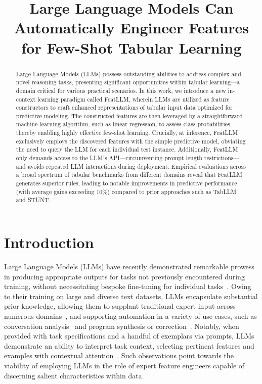 \title{Large Language Models Can Automatically Engineer Features for Few-Shot Tabular Learning}

\begin{abstract}
Large Language Models (LLMs) possess outstanding abilities to address complex and novel reasoning tasks, presenting significant opportunities within tabular learning—a domain critical for various practical scenarios. In this work, we introduce a new in-context learning paradigm called \textsf{FeatLLM}, wherein LLMs are utilized as feature constructors to craft enhanced representations of tabular input data optimized for predictive modeling. The constructed features are then leveraged by a straightforward machine learning algorithm, such as linear regression, to assess class probabilities, thereby enabling highly effective few-shot learning. Crucially, at inference, \textsf{FeatLLM} exclusively employs the discovered features with the simple predictive model, obviating the need to query the LLM for each individual test instance. Additionally, \textsf{FeatLLM} only demands access to the LLM's API—circumventing prompt length restrictions—and avoids repeated LLM interactions during deployment. Empirical evaluations across a broad spectrum of tabular benchmarks from different domains reveal that \textsf{FeatLLM} generates superior rules, leading to notable improvements in predictive performance (with average gains exceeding 10\%) compared to prior approaches such as TabLLM and STUNT.
\end{abstract}

\section{Introduction}
Large Language Models (LLMs) have recently demonstrated remarkable prowess in producing appropriate outputs for tasks not previously encountered during training, without necessitating bespoke fine-tuning for individual tasks~\cite{creswell2022selection,imani2023mathprompter,taylor2022galactica}. Owing to their training on large and diverse text datasets, LLMs encapsulate substantial prior knowledge, allowing them to supplant traditional expert input across numerous domains~\cite{Genomes2021,singhal2023large,wilcox2003role}, and supporting automation in a variety of use cases, such as conversation analysis~\cite{finch2023leveraging} and program synthesis or correction~\cite{fan2023automated}. Notably, when provided with task specifications and a handful of exemplars via prompts, LLMs demonstrate an ability to interpret task context, selecting pertinent features and examples with contextual attention~\cite{brown2020language,zhao2023survey}. Such observations point towards the viability of employing LLMs in the role of expert feature engineers capable of discerning salient characteristics within data.

